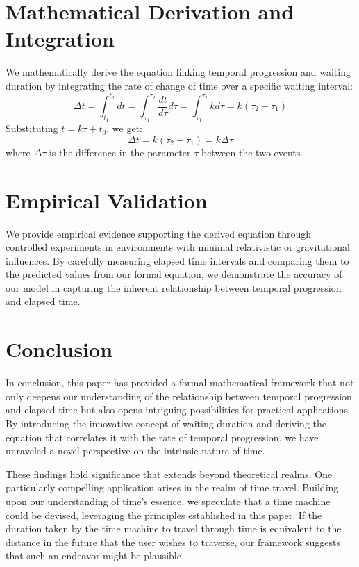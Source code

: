\documentclass{article}
\begin{document}
\section{Mathematical Derivation and Integration}
We mathematically derive the equation linking temporal progression and waiting duration by integrating the rate of change of time over a specific waiting interval:
\begin{equation}
    \Delta t = \int_{t_1}^{t_2} dt = \int_{\tau_1}^{\tau_2} \frac{dt}{d\tau} d\tau = \int_{\tau_1}^{\tau_2} k d\tau = k (\tau_2 - \tau_1)
\end{equation}
Substituting \( t = k \tau + t_0 \), we get:
\begin{equation}
    \Delta t = k (\tau_2 - \tau_1) = k \Delta \tau
\end{equation}
where \( \Delta \tau \) is the difference in the parameter \( \tau \) between the two events.

\section{Empirical Validation}
We provide empirical evidence supporting the derived equation through controlled experiments in environments with minimal relativistic or gravitational influences. By carefully measuring elapsed time intervals and comparing them to the predicted values from our formal equation, we demonstrate the accuracy of our model in capturing the inherent relationship between temporal progression and elapsed time.

\section{Conclusion}
In conclusion, this paper has provided a formal mathematical framework that not only deepens our understanding of the relationship between temporal progression and elapsed time but also opens intriguing possibilities for practical applications. By introducing the innovative concept of waiting duration and deriving the equation that correlates it with the rate of temporal progression, we have unraveled a novel perspective on the intrinsic nature of time.

These findings hold significance that extends beyond theoretical realms. One particularly compelling application arises in the realm of time travel. Building upon our understanding of time's essence, we speculate that a time machine could be devised, leveraging the principles established in this paper. If the duration taken by the time machine to travel through time is equivalent to the distance in the future that the user wishes to traverse, our framework suggests that such an endeavor might be plausible.
\end{document}
